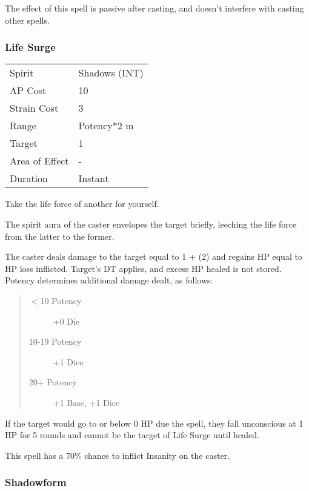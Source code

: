 \documentclass[11pt,a4paper,twocolumn]{book}
\begin{document}
The effect of this spell is passive after casting, and doesn't interfere with casting other spells.

\subsubsection*{Life Surge}
{
	\begin{tabu} to 75mm{| X[l,4] | X[l,7] |}
		\hline
		Spirit 			& Shadows (INT) 		\\
		AP Cost	      	& 10 					\\
		Strain Cost     & 3 					\\
		Range     		& Potency*2 m			\\
		Target      	& 1						\\
		Area of Effect  & -  	 				\\
		Duration     	& Instant				\\ \hline
	\end{tabu}
	
}

\medskip

Take the life force of another for yourself.

The spirit aura of the caster envelopes the target briefly, leeching the life force from the latter to the former.

The caster deals damage to the target equal to 1 + (2) and regains HP equal to HP loss inflicted. Target's DT applies, and excess HP healed is not stored. Potency determines additional damage dealt, as follows:

\begin{quote}
	\begin{description}
		\item[$<$10 Potency] 	+0 Die
		\item[10-19 Potency] 	+1 Dice
		\item[20+ Potency] 		+1 Base, +1 Dice
	\end{description}	
\end{quote}

If the target would go to or below 0 HP due the spell, they fall unconscious at 1 HP for 5 rounds and cannot be the target of Life Surge until healed.

This spell has a 70\% chance to inflict Insanity on the caster.


\subsubsection*{Shadowform}
\end{document}

